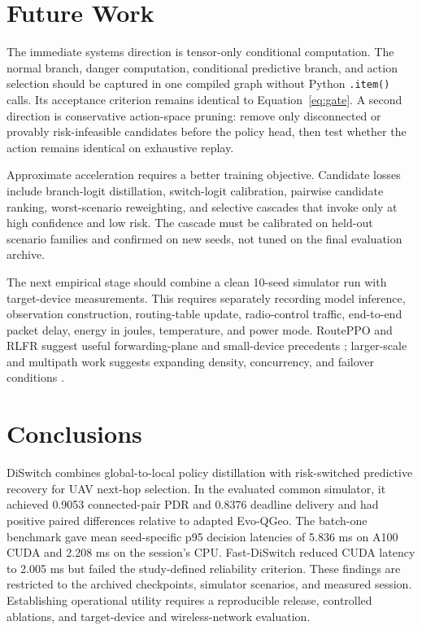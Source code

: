 \documentclass[drones,article,submit,moreauthors]{Definitions/mdpi}
\begin{document}
\section{Future Work}

The immediate systems direction is tensor-only conditional computation. The normal branch, danger computation, conditional predictive branch, and action selection should be captured in one compiled graph without Python \texttt{.item()} calls. Its acceptance criterion remains identical to Equation~\eqref{eq:gate}. A second direction is conservative action-space pruning: remove only disconnected or provably risk-infeasible candidates before the policy head, then test whether the action remains identical on exhaustive replay.

Approximate acceleration requires a better training objective. Candidate losses include branch-logit distillation, switch-logit calibration, pairwise candidate ranking, worst-scenario reweighting, and selective cascades that invoke \FastDS{} only at high confidence and low risk. The cascade must be calibrated on held-out scenario families and confirmed on new seeds, not tuned on the final evaluation archive.

The next empirical stage should combine a clean 10-seed simulator run with target-device measurements. This requires separately recording model inference, observation construction, routing-table update, radio-control traffic, end-to-end packet delay, energy in joules, temperature, and power mode. RoutePPO and RLFR suggest useful forwarding-plane and small-device precedents \cite{curmen2026routeppo,li2024rlfr}; larger-scale and multipath work suggests expanding density, concurrency, and failover conditions \cite{zhang2026large,zhao2026multipath}.

\section{Conclusions}

DiSwitch combines global-to-local policy distillation with risk-switched predictive recovery for UAV next-hop selection. In the evaluated common simulator, it achieved 0.9053 connected-pair PDR and 0.8376 deadline delivery and had positive paired differences relative to adapted Evo-QGeo. The batch-one benchmark gave mean seed-specific p95 decision latencies of 5.836 ms on A100 CUDA and 2.208 ms on the session's CPU. Fast-DiSwitch reduced CUDA latency to 2.005 ms but failed the study-defined reliability criterion. These findings are restricted to the archived checkpoints, simulator scenarios, and measured session. Establishing operational utility requires a reproducible release, controlled ablations, and target-device and wireless-network evaluation.
\end{document}

